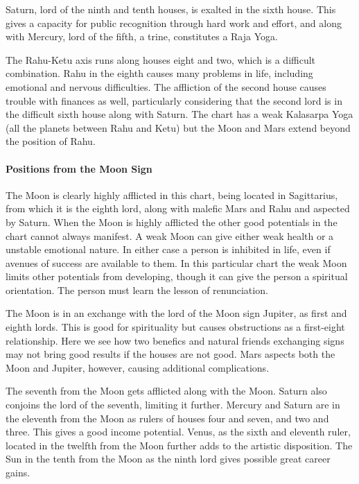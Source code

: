  

Saturn, lord of the ninth and tenth houses, is exalted in the sixth house. This gives a capacity for public recognition through hard work and effort, and along with Mercury, lord of the fifth, a trine, constitutes a Raja Yoga.

 

The Rahu-Ketu axis runs along houses eight and two, which is a difficult combination. Rahu in the eighth causes many problems in life, including emotional and nervous difficulties. The affliction of the second house causes trouble with finances as well, particularly considering that the second lord is in the difficult sixth house along with Saturn. The chart has a weak Kalasarpa Yoga (all the planets between Rahu and Ketu) but the Moon and Mars extend beyond the position of Rahu.

 
\paragraph{Positions from the Moon Sign}

 

The Moon is clearly highly afflicted in this chart, being located in Sagittarius, from which it is the eighth lord, along with malefic Mars and Rahu and aspected by Saturn. When the Moon is highly afflicted the other good potentials in the chart cannot always manifest. A weak Moon can give either weak health or a unstable emotional nature. In either case a person is inhibited in life, even if avenues of success are available to them. In this particular chart the weak Moon limits other potentials from developing, though it can give the person a spiritual orientation. The person must learn the lesson of renunciation.

 

The Moon is in an exchange with the lord of the Moon sign Jupiter, as first and eighth lords. This is good for spirituality but causes obstructions as a first-eight relationship. Here we see how two benefics and natural friends exchanging signs may not bring good results if the houses are not good. Mars aspects both the Moon and Jupiter, however, causing additional complications.

 

The seventh from the Moon gets afflicted along with the Moon. Saturn also conjoins the lord of the seventh, limiting it further. Mercury and Saturn are in the eleventh from the Moon as rulers of houses four and seven, and two and three. This gives a good income potential. Venus, as the sixth and eleventh ruler, located in the twelfth from the Moon further adds to the artistic disposition. The Sun in the tenth from the Moon as the ninth lord gives possible great career gains.

